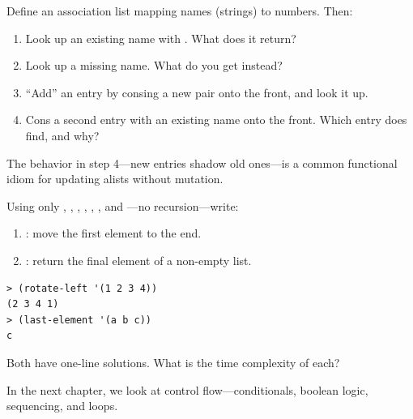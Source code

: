 \begin{exercise}
Define an association list  mapping names (strings) to numbers. Then:

\begin{enumerate}
\item Look up an existing name with . What does it return?
\item Look up a missing name. What do you get instead?
\item ``Add'' an entry by consing a new pair onto the front, and look it up.
\item Cons a second entry with an existing name onto the front. Which entry does  find, and why?
\end{enumerate}

The behavior in step 4---new entries shadow old ones---is a common functional idiom for updating alists without mutation.
\end{exercise}

\begin{exercise}
Using only , , , , , , and ---no recursion---write:

\begin{enumerate}
\item {}: move the first element to the end.
\item {}: return the final element of a non-empty list.
\end{enumerate}

\begin{lstlisting}[style=repl]
> (rotate-left '(1 2 3 4))
(2 3 4 1)
> (last-element '(a b c))
c
\end{lstlisting}

Both have one-line solutions. What is the time complexity of each?
\end{exercise}

In the next chapter, we look at control flow---conditionals, boolean logic, sequencing, and loops.

\chapterend
